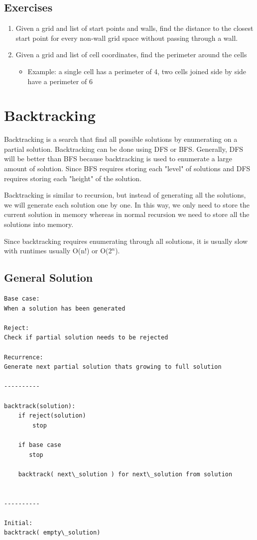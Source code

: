 \documentclass[11pt,oneside]{book}
\begin{document}
\subsection{Exercises}

\begin{enumerate}
\item Given a grid and list of start points and walls, find the distance to the closest start point for every non-wall grid space without passing through a wall.
\item Given a grid and list of cell coordinates, find the perimeter around the cells

\begin{itemize}
\item Example: a single cell has a perimeter of 4, two cells joined side by side have a perimeter of 6
\end{itemize}
\end{enumerate}

        \section{ Backtracking }
        

Backtracking is a search that find all possible solutions by enumerating on a partial solution. Backtracking can be done using DFS or BFS. Generally, DFS will be better than BFS because backtracking is used to enumerate a large amount of solution. Since BFS requires storing each "level" of solutions and DFS requires storing each "height" of the solution.

Backtracking is similar to recursion, but instead of generating all the solutions, we will generate each solution one by one. In this way, we only need to store the current solution in memory whereas in normal recursion we need to store all the solutions into memory.

Since backtracking requires enumerating through all solutions, it is usually slow with runtimes usually O(n!) or O(2$^{n}$).

\subsection{General Solution}

\begin{lstlisting}
Base case:
When a solution has been generated

Reject:
Check if partial solution needs to be rejected

Recurrence:
Generate next partial solution thats growing to full solution

----------

backtrack(solution):
    if reject(solution)
        stop

    if base case
       stop

    backtrack( next\_solution ) for next\_solution from solution


----------

Initial:
backtrack( empty\_solution)

\end{lstlisting}
\end{document}
